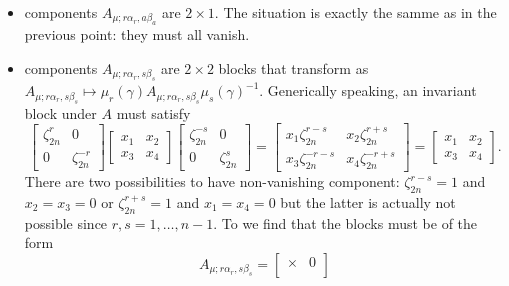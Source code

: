 \begin{itemize}
                \item components $A_{\mu;r\alpha_r,a\beta_a}$ are $2\times 1$. The situation is exactly the samme as in the previous point: they must all vanish.
                \item components $A_{\mu;r\alpha_r,s\beta_s}$ are $2\times 2$ blocks that transform as $A_{\mu;r\alpha_r,s\beta_s}\mapsto\mu_r(\gamma)A_{\mu;r\alpha_r,s\beta_s}\mu_s(\gamma)^{-1}$. Generically speaking, an invariant block under $A$ must satisfy
                \begin{equation}
                    \begin{bmatrix}
                        \zeta^{r}_{2n} & 0 \\
                        0 & \zeta^{-r}_{2n}
                    \end{bmatrix}
                    \begin{bmatrix}
                        x_1 & x_2 \\
                        x_3 & x_4
                    \end{bmatrix}
                    \begin{bmatrix}
                        \zeta^{-s}_{2n} & 0 \\
                        0 & \zeta^{s}_{2n}
                    \end{bmatrix}=
                    \begin{bmatrix}
                        x_1\zeta^{r-s}_{2n} & x_2\zeta^{r+s}_{2n} \\
                        x_3\zeta^{-r-s}_{2n} & x_4\zeta^{-r+s}_{2n}
                    \end{bmatrix}=
                    \begin{bmatrix}
                        x_1 & x_2 \\
                        x_3 & x_4
                    \end{bmatrix}.
                \end{equation}
                There are two possibilities to have non-vanishing component: $\zeta^{r-s}_{2n}=1$ and $x_2=x_3=0$ or $\zeta^{r+s}_{2n}=1$ and $x_1=x_4=0$ but the latter is actually not possible since $r,s=1,\dots,n-1$. To we find that the blocks must be of the form
                \begin{equation}
                    A_{\mu;r\alpha_r,s\beta_s}=
                        \begin{bmatrix}
                            \times & 0 \\

\end{bmatrix}
\end{equation}
\end{itemize}
